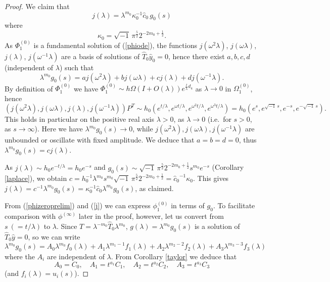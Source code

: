\documentclass[a4paper,12pt,leqno]{amsart}
\numberwithin{equation}{section}
\theoremstyle{plain}
\theoremstyle{definition}
\newcommand{\la}{\lambda}
\newcommand{\Om}{\Omega}
\newcommand{\om}{\omega}
\newcommand{\ka}{\kappa}
\renewcommand{\i}{ {\scriptscriptstyle\sqrt{-1}}\, }
\newcommand{\ii}{ {\scriptstyle\sqrt{-1}}\, }
\newcommand{\Omz}{  \Om^{(0)}  }
\newcommand{\Phiz}{\Phi^{(0)}}
\newcommand{\phiz}{\phi^{(0)}}
\newcommand{\phii}{\phi^{(\infty)}}
\newcommand{\nn}{m}
\begin{document}
\begin{proof}
We claim that 
\begin{equation}\label{j}
j(\la)=\la^{\nn_0} \ka_0^{-1} \hat c_0\, g_0(s)
\end{equation}
where
\[
\ka_0=\ii \pi^{\frac52} 2^{-2\nn_0+\frac12}.
\]
As $\Phiz_1$ is a fundamental solution of (\ref{phiode}), the functions 
$j(\om^2\la)$,  $j(\om\la)$,  $j(\la)$,  $j(\om^{-1}\la)$ are a basis of solutions of 
$\hat T_0 \hat y_0=0$, hence there exist $a,b,c,d$ (independent of $\la$) such that
\[
\la^{\nn_0}g_0(s)=
a  j(\om^2\la) + b j(\om\la) + c j(\la) + d j(\om^{-1}\la).
\]
By definition of $\Phiz_1$ we have 
$\Phiz_1\sim
h\Om (I+O(\la) ) e^{\frac t\la d_4}$ as $\la\to0$ in $\Omz_1$,
hence
$
(j(\om^2\la), j(\om\la), j(\la), j(\om^{-1}\la))P^T
\sim
h_0(e^{t/\la},e^{\om t/\la},e^{\om^2 t/\la},e^{\om^3 t/\la}) 
=
h_0(e^{s},e^{\i s},e^{-s},e^{-\i s}).
$
This holds in particular on the positive real axis $\la>0$, as $\la\to 0$ (i.e.\ for $s>0$, as $s\to \infty$). Here we have $\la^{\nn_0}g_0(s)\to 0$, while 
$j(\om^2\la), j(\om\la), j(\om^{-1}\la)$ are unbounded or oscillate with fixed amplitude. 
We deduce that  $a=b=d=0$, thus $\la^{\nn_0}g_0(s)=cj(\la)$. 

As $j(\la)\sim h_0 e^{-t/\la}=h_0 e^{-s}$ and
$g_0(s)\sim \ii \pi^{\frac52} 2^{-2\nn_0+\frac12} s^{\nn_0} e^{-s}$ 
(Corollary \ref{laplace}),  we obtain 
$c=h_0^{-1} \la^{\nn_0} s^{\nn_0}  \ii \pi^{\frac52} 2^{-2\nn_0+\frac12}
={\hat c_0}^{-1} \ka_0$.  This gives $j(\la)=c^{-1}\la^{\nn_0}g_0(s)
= \ka_0^{-1}\hat c_0 \la^{\nn_0} g_0(s)$, as claimed.    

From (\ref{phizeroprelim}) and (\ref{j}) we can express $\phiz_1$ in terms of $g_0$.  To facilitate comparison with $\phii$ later in the proof, however, let us convert from $s \ (=t/\la)$ to $\la$.  Since
$T=\la^{-\nn_0} \hat T_0 \la^{\nn_0}$, $g(\la)=\la^{\nn_0} g_0(s)$ is a solution of $\hat T_0 \hat y=0$, so we can write
\[
\la^{\nn_0}g_0(s)=
A_0 \la^{\nn_0}f_0(\la) + 
A_1 \la^{\nn_1-1}f_1(\la) + 
A_2 \la^{\nn_2-2}f_2(\la) + 
A_3 \la^{\nn_3-3}f_3(\la)
\]
where the $A_i$ are independent of $\la$.  From Corollary \ref{taylor} we deduce that
\[
A_0=C_0,\quad A_1=t^{a_1}C_1,\quad A_2=t^{a_2}C_2,\quad A_3=t^{a_3}C_3
\]
(and $f_i(\la)=u_i(s)$). 


\end{proof}
\end{document}
